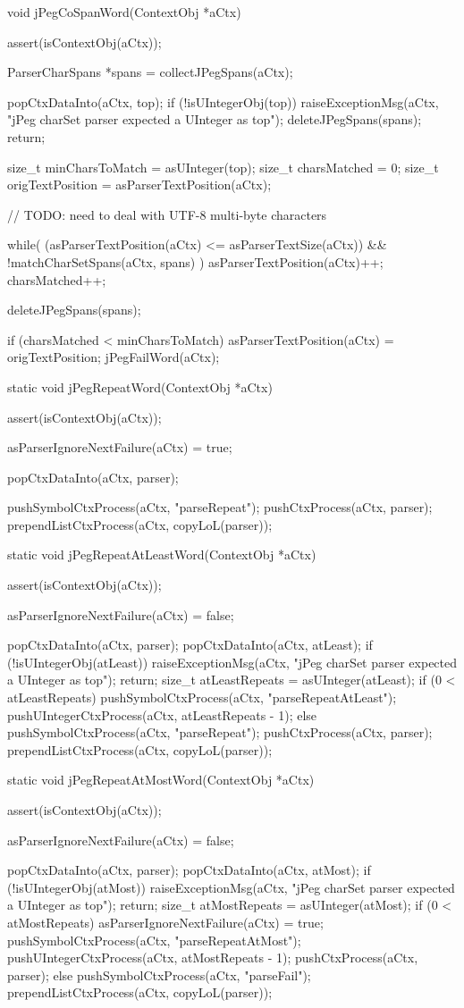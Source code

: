 \startCCode
void jPegCoSpanWord(ContextObj *aCtx) {
  assert(isContextObj(aCtx));
  
  ParserCharSpans *spans = collectJPegSpans(aCtx);
  
  popCtxDataInto(aCtx, top);
  if (!isUIntegerObj(top)) {
    raiseExceptionMsg(aCtx,
      "jPeg charSet parser expected a UInteger as top");
    deleteJPegSpans(spans);
    return;
  }
  
  size_t minCharsToMatch  = asUInteger(top);
  size_t charsMatched     = 0;
  size_t origTextPosition = asParserTextPosition(aCtx);
  
  // TODO: need to deal with UTF-8 multi-byte characters
  
  while(
    (asParserTextPosition(aCtx) <= asParserTextSize(aCtx)) &&
    !matchCharSetSpans(aCtx, spans)
  ) {
    asParserTextPosition(aCtx)++;
    charsMatched++;
  }

  deleteJPegSpans(spans);

  if (charsMatched < minCharsToMatch) {
    asParserTextPosition(aCtx) = origTextPosition;
    jPegFailWord(aCtx);
  }
}

static void jPegRepeatWord(ContextObj *aCtx) {
  assert(isContextObj(aCtx));
  
  asParserIgnoreNextFailure(aCtx) = true;
  
  popCtxDataInto(aCtx, parser);
  
  pushSymbolCtxProcess(aCtx, "parseRepeat");
  pushCtxProcess(aCtx, parser);
  prependListCtxProcess(aCtx, copyLoL(parser));
}

static void jPegRepeatAtLeastWord(ContextObj *aCtx) {
  assert(isContextObj(aCtx));
  
  asParserIgnoreNextFailure(aCtx) = false;
  
  popCtxDataInto(aCtx, parser);
  popCtxDataInto(aCtx, atLeast);
  if (!isUIntegerObj(atLeast)) {
    raiseExceptionMsg(aCtx,
      "jPeg charSet parser expected a UInteger as top");
    return;
  }
  size_t atLeastRepeats = asUInteger(atLeast);
  if (0 < atLeastRepeats) {
    pushSymbolCtxProcess(aCtx, "parseRepeatAtLeast");
    pushUIntegerCtxProcess(aCtx, atLeastRepeats - 1);
  } else {
    pushSymbolCtxProcess(aCtx, "parseRepeat");
  }
  pushCtxProcess(aCtx, parser);
  prependListCtxProcess(aCtx, copyLoL(parser));
}

static void jPegRepeatAtMostWord(ContextObj *aCtx) {
  assert(isContextObj(aCtx));
  
  asParserIgnoreNextFailure(aCtx) = false;
  
  popCtxDataInto(aCtx, parser);
  popCtxDataInto(aCtx, atMost);
  if (!isUIntegerObj(atMost)) {
    raiseExceptionMsg(aCtx,
      "jPeg charSet parser expected a UInteger as top");
    return;
  }
  size_t atMostRepeats = asUInteger(atMost);
  if (0 < atMostRepeats) {
    asParserIgnoreNextFailure(aCtx) = true;
    pushSymbolCtxProcess(aCtx, "parseRepeatAtMost");
    pushUIntegerCtxProcess(aCtx, atMostRepeats - 1);
    pushCtxProcess(aCtx, parser);
  } else {
    pushSymbolCtxProcess(aCtx, "parseFail");
  }
  prependListCtxProcess(aCtx, copyLoL(parser));
}
\stopCCode

